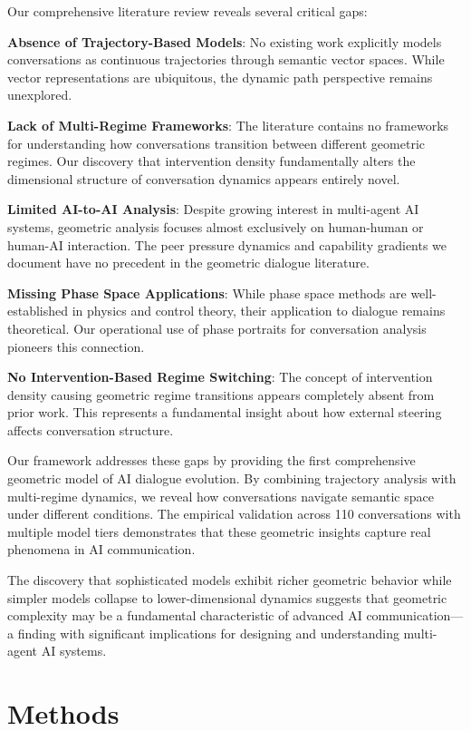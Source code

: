 \documentclass[11pt,letterpaper]{article}
\begin{document}
Our comprehensive literature review reveals several critical gaps:

\textbf{Absence of Trajectory-Based Models}: No existing work explicitly models conversations as continuous trajectories through semantic vector spaces. While vector representations are ubiquitous, the dynamic path perspective remains unexplored.

\textbf{Lack of Multi-Regime Frameworks}: The literature contains no frameworks for understanding how conversations transition between different geometric regimes. Our discovery that intervention density fundamentally alters the dimensional structure of conversation dynamics appears entirely novel.

\textbf{Limited AI-to-AI Analysis}: Despite growing interest in multi-agent AI systems, geometric analysis focuses almost exclusively on human-human or human-AI interaction. The peer pressure dynamics and capability gradients we document have no precedent in the geometric dialogue literature.

\textbf{Missing Phase Space Applications}: While phase space methods are well-established in physics and control theory, their application to dialogue remains theoretical. Our operational use of phase portraits for conversation analysis pioneers this connection.

\textbf{No Intervention-Based Regime Switching}: The concept of intervention density causing geometric regime transitions appears completely absent from prior work. This represents a fundamental insight about how external steering affects conversation structure.

Our framework addresses these gaps by providing the first comprehensive geometric model of AI dialogue evolution. By combining trajectory analysis with multi-regime dynamics, we reveal how conversations navigate semantic space under different conditions. The empirical validation across 110 conversations with multiple model tiers demonstrates that these geometric insights capture real phenomena in AI communication.

The discovery that sophisticated models exhibit richer geometric behavior while simpler models collapse to lower-dimensional dynamics suggests that geometric complexity may be a fundamental characteristic of advanced AI communication—a finding with significant implications for designing and understanding multi-agent AI systems.

\section{Methods}
\end{document}
